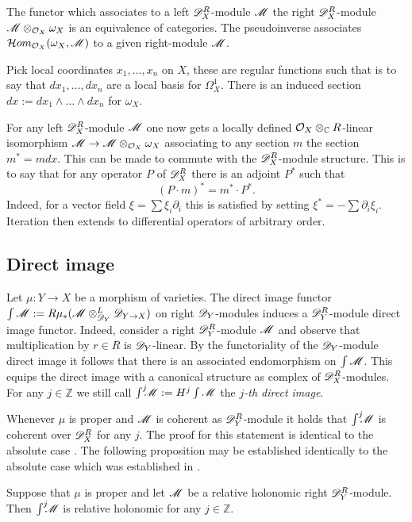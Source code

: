 
The functor which associates to a left $\mathscr{D}_X^R$-module $\mathscr{M}$ the right $\mathscr{D}_X^R$-module $\mathscr{M}\otimes_{\mathcal{O}_X}\omega_X$ is an equivalence of categories.
The pseudoinverse associates $\mathcal{H}om_{\mathcal{O}_X}(\omega_X,\allowbreak\mathscr{M})$ to a given right-module $\mathscr{M}$.

Pick local coordinates $x_1,\ldots, x_n$ on $X$, these are regular functions such that is to say that $dx_1,\ldots,dx_n$ are a local basis for $\Omega_{X}^1$.
There is an induced section $dx := dx_1\wedge \ldots \wedge dx_n$ for $\omega_X$.

For any left $\mathscr{D}_X^R$-module $\mathscr{M}$ one now gets a locally defined $\mathcal{O}_X\otimes_{\mathbb{C}} R$-linear isomorphism $\mathscr{M} \to \mathscr{M}\otimes_{\mathcal{O}_X}\omega_X$  associating to any section $m$ the section $m^* = m dx$.
This can be made to commute with the $\mathscr{D}_X^R$-module structure.
This is to say that for any operator $P$ of $\mathscr{D}_X^R$ there is an adjoint $P^*$ such that
$$(P\cdot m)^* = m^* \cdot P^*.$$
Indeed, for a vector field $\xi = \sum \xi_i \partial_i$ this is satisfied by setting $\xi^* = -\sum \partial_i \xi_i$.
Iteration then extends to differential operators of arbitrary order.
\subsection{Direct image}
Let $\mu:Y\to X$ be a morphism of varieties.
The direct image functor $\int \mathscr{M}:= R\mu_*(\mathscr{M}\otimes_{\mathscr{D}_Y}^L \mathscr{D}_{Y\to X}) $ on right $\mathscr{D}_Y$-modules induces a $\mathscr{D}_Y^R$-module direct image functor.
Indeed, consider a right $\mathscr{D}_Y^R$-module $\mathscr{M}$ and observe that multiplication by $r\in R$ is $\mathscr{D}_Y$-linear.
By the functoriality of the $\mathscr{D}_Y$-module direct image it follows that there is an associated endomorphism on $\int \mathscr{M}$.
This equips the direct image with a canonical structure as complex of $\mathscr{D}_X^R$-modules.
For any $j\in \mathbb{Z}$ we still call $\int^j \mkern -8mu\mathscr{M} := H^j\int\mathscr{M}$ the {\it $j$-th direct image}.

Whenever $\mu$ is proper and $\mathscr{M}$ is coherent as $\mathscr{D}_Y^R$-module it holds that $\int^j \mkern -8mu\mathscr{M}$ is coherent over $\mathscr{D}_X^R$ for any $j$.
The proof for this statement is identical to the absolute case \cite[Theorem 2.5.1]{hotta2007d}.
The following proposition may be established identically to the absolute case which was established in .
\begin{proposition}\label{prop: DirectImageRelHol}
  Suppose that $\mu$ is proper and let $\mathscr{M}$ be a relative holonomic right $\mathscr{D}_Y^R$-module.
  Then $\int^j \mkern -8mu \mathscr{M}$ is relative holonomic for any $j\in \mathbb{Z}$.
\end{proposition}

